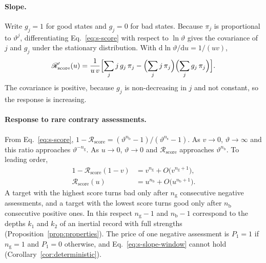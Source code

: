 \documentclass[10pt]{wlscirep}
\newcommand{\Rmap}{\mathscr{R}}            %
\newcommand{\Pone}{P_{1}}                  %
\newcommand{\dd}{\mathrm{d}}
\theoremstyle{plain}
\theoremstyle{remark}
\begin{document}
\paragraph{Slope.} Write $g_j=1$ for good states and $g_j=0$ for bad states. Because $\pi_j$ is proportional to $\vartheta^j$, differentiating Eq.~\eqref{eq:s-score} with respect to $\ln\vartheta$ gives the covariance of $j$ and $g_j$ under the stationary distribution. With $\dd\ln\vartheta/\dd u=1/(uv)$,
\begin{equation}
\Rmap'_{\mathrm{score}}(u)=\frac{1}{u\,v}\Bigl[\sum_jj\,g_j\,\pi_j-\Bigl(\sum_jj\,\pi_j\Bigr)\Bigl(\sum_jg_j\,\pi_j\Bigr)\Bigr].
\label{eq:s-score-derivative}
\end{equation}
The covariance is positive, because $g_j$ is non-decreasing in $j$ and not constant, so the response is increasing.

\paragraph{Response to rare contrary assessments.} From Eq.~\eqref{eq:s-score}, $1-\Rmap_{\mathrm{score}}=(\vartheta^{n_{\mathrm b}}-1)/(\vartheta^{n_{\mathrm s}}-1)$. As $v\to0$, $\vartheta\to\infty$ and this ratio approaches $\vartheta^{-n_{\mathrm g}}$. As $u\to0$, $\vartheta\to0$ and $\Rmap_{\mathrm{score}}$ approaches $\vartheta^{n_{\mathrm b}}$. To leading order,
\begin{equation}
\begin{aligned}
1-\Rmap_{\mathrm{score}}(1-v)&=v^{n_{\mathrm g}}+O\bigl(v^{n_{\mathrm g}+1}\bigr),\\
\Rmap_{\mathrm{score}}(u)&=u^{n_{\mathrm b}}+O\bigl(u^{n_{\mathrm b}+1}\bigr).
\end{aligned}
\label{eq:s-score-limits}
\end{equation}
A target with the highest score turns bad only after $n_{\mathrm g}$ consecutive negative assessments, and a target with the lowest score turns good only after $n_{\mathrm b}$ consecutive positive ones. In this respect $n_{\mathrm g}-1$ and $n_{\mathrm b}-1$ correspond to the depths $k_1$ and $k_2$ of an inertial record with full strengths (Proposition~\ref{prop:properties}). The price of one negative assessment is $\Pone=1$ if $n_{\mathrm g}=1$ and $\Pone=0$ otherwise, and Eq.~\eqref{eq:s-slope-window} cannot hold (Corollary~\ref{cor:deterministic}).
\end{document}
